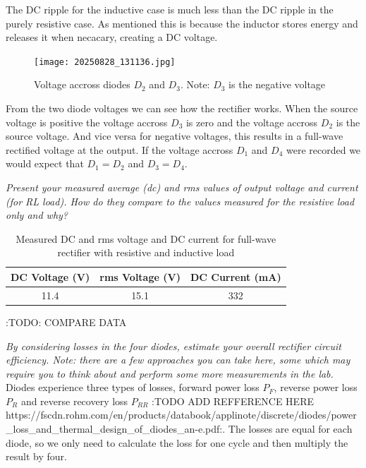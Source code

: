 \documentclass[12pt,a4paper]{article}
\begin{document}
The DC ripple for the inductive case is much less than the DC ripple in the purely resistive case. As mentioned this is because the inductor stores energy and releases it when necacary, creating a DC voltage.

\begin{figure}[H]
\centering
\texttt{[image: 20250828\_131136.jpg]}
\caption{Voltage accross diodes \(D_2\) and \(D_3\). Note: \(D_3\) is the negative voltage \label{fig:figure4}}
\end{figure}

From the two diode voltages we can see how the rectifier works. When the source voltage is positive the voltage accross \(D_3\) is zero and the voltage accross \(D_2\) is the source voltage. And vice versa for negative voltages, this results in a full-wave rectified voltage at the output. If the voltage accross \(D_1\) and \(D_4\) were recorded we would expect that \(D_1 = D_2\) and \(D_3 = D_4\).

\textit{Present your measured average (dc) and rms values of output voltage and current (for RL load).
How do they compare to the values measured for the resistive load only and why?}\\

\begin{table}[H]
\caption{Measured DC and rms voltage and DC current for full-wave rectifier with resistive and inductive load \label{tab:table3}}
\centering
\begin{tabular}{|c|c|c|}
\hline
DC Voltage (V) & rms Voltage (V) & DC Current (mA)\\
\hline
11.4 & 15.1 & 332\\
\hline
\end{tabular}
\end{table}
:TODO: COMPARE DATA

\textit{By considering losses in the four diodes, estimate your overall rectifier circuit efficiency. Note: there
are a few approaches you can take here, some which may require you to think about and perform
some more measurements in the lab.}\\


Diodes experience three types of losses, forward power loss \(P_F\), reverse power loss \(P_R\) and reverse recovery loss \(P_{RR}\) :TODO ADD REFFERENCE HERE https://fscdn.rohm.com/en/products/databook/applinote/discrete/diodes/power_loss_and_thermal_design_of_diodes_an-e.pdf:. The losses are equal for each diode, so we only need to calculate the loss for one cycle and then multiply the result by four.
\end{document}
